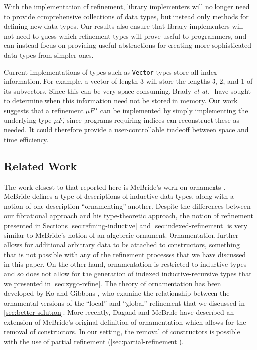 \documentclass{LMCS}
\begin{document}
\vspace*{0.03in}

 With the implementation of refinement,
library implementers will no longer need to provide comprehensive
collections of data types, but instead only methods for defining new
data types. Our results also ensure that library implementers will not
need to guess which refinement types will prove useful to programmers,
and can instead focus on providing useful abstractions for creating
more sophisticated data types from simpler ones.

\vspace*{0.03in}

 Current implementations of types such
as {\tt Vector} types store all index information. For example, a
vector of length 3 will store the lengths 3, 2, and 1 of its
subvectors. Since this can be very space-consuming, Brady \emph{et
  al.}~\cite{brady03inductive} have sought to determine when this
information need not be stored in memory. Our work suggests that a
refinement $\mu F^{\alpha}$ can be implemented by simply implementing
the underlying type $\mu F$, since programs requiring indices can
reconstruct these as needed. It could therefore provide a
user-controllable tradeoff between space and time efficiency.

\subsection{Related Work}

The work closest to that reported here is McBride's work on ornaments
\cite{mcbride10ornaments}. McBride defines a type of descriptions of
inductive data types, along with a notion of one description
``ornamenting'' another. Despite the differences between our
fibrational approach and his type-theoretic approach, the notion of
refinement presented in \hyperref[sec:refining-inductive]{Sections
  \ref*{sec:refining-inductive}} and
\hyperref[sec:indexed-refinement]{ \ref*{sec:indexed-refinement}} is
very similar to McBride's notion of an algebraic
ornament. Ornamentation further allows for additional arbitrary data
to be attached to constructors, something that is not possible with
any of the refinement processes that we have discussed in this
paper. On the other hand, ornamentation is restricted to inductive
types and so does not allow for the generation of indexed
inductive-recursive types that we presented in
\autoref{sec:zygo-refine}. The theory of ornamentation has been
developed by Ko and Gibbons \cite{KoGibbons2011OAOAOO}, who examine
the relationship between the ornamental versions of the ``local'' and
``global'' refinement that we discussed in
\autoref{sec:better-solution}. More recently, Dagand and McBride
\cite{DagandMcBride2012funOrn} have described an extension of
McBride's original definition of ornamentation which allows for the
removal of constructors. In our setting, the removal of constructors
is possible with the use of partial refinement
(\autoref{sec:partial-refinement}).
\end{document}
